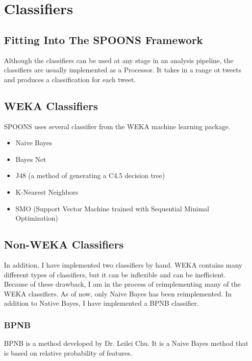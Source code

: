 \documentclass[12pt]{ucthesis}
\begin{document}
\chapter{Classifiers}
\label{classifiers}

\section{Fitting Into The SPOONS Framework}
\label{class-framework}
Although the classifiers can be used at any stage in an analysis pipeline, the classifiers are usually implemented as
a Processor. It takes in a range ot tweets and produces a classification for each tweet.

\section{WEKA Classifiers}
\label{class-weka}
SPOONS uses several classifier from the WEKA machine learning package\cite{weka}.

\begin{itemize}
   \item Naive Bayes
   \item Bayes Net
   \item J48 (a method of generating a C4.5 decision tree\cite{j48})
   \item K-Nearest Neighbors
   \item SMO (Support Vector Machine trained with Sequential Minimal Optimization\cite{smo})
\end{itemize}

\section{Non-WEKA Classifiers}
\label{class-nonweka}
In addition, I have implemented two classifiers by hand. WEKA contains many different types of classifiers, but
it can be inflexible and can be inefficient. Because of these drawback, I am in the process of reimplementing
many of the WEKA classifiers. As of now, only Naive Bayes has been reimplemented. In addition to Native Bayes,
I have implemented a BPNB classifier\cite{bpnb}.

\subsection{BPNB}
\label{class-nonweka-bpnb}
BPNB is a method developed by Dr. Leilei Chu. It is a Naive Bayes method that is based on relative probability of features.
\end{document}
